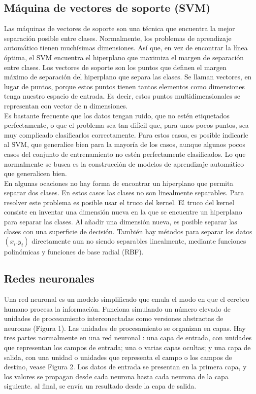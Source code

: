\documentclass[conference]{IEEEtran}
\begin{document}
\subsection{Máquina de vectores de soporte (SVM)}
Las máquinas de vectores de soporte son una técnica que encuentra la mejor separación posible entre clases. Normalmente, los problemas de aprendizaje automático tienen muchísimas dimensiones. Así que, en vez de encontrar la línea óptima, el SVM encuentra el hiperplano que maximiza el margen de separación entre clases. Los vectores de soporte son los puntos que definen el margen máximo de separación del hiperplano que separa las clases. Se llaman vectores, en lugar de puntos, porque estos puntos tienen tantos elementos como dimensiones tenga nuestro espacio de entrada. Es decir, estos puntos multidimensionales se representan con vector de n dimensiones.\\

Es bastante frecuente que los datos tengan ruido, que no estén etiquetados perfectamente, o que el problema sea tan difícil que, para unos pocos puntos, sea muy complicado clasificarlos correctamente. Para estos casos, es posible indicarle al SVM, que generalice bien para la mayoría de los casos, aunque algunos pocos casos del conjunto de entrenamiento no estén perfectamente clasificados. Lo que normalmente se busca es la construcción de modelos de aprendizaje automático que generalicen bien. \\

En algunas ocaciones no hay forma de encontrar un hiperplano que permita separar dos clases. En estos casos las clases no son linealmente separables. Para resolver este problema es posible usar el truco del kernel. El truco del kernel consiste en inventar una dimensión nueva en la que se encuentre un hiperplano para separar las clases. Al añadir una dimensión nueva, es posible separar las clases con una superficie de decisión. También hay métodos para separar los datos $(x_i. y_i)$ directamente aun no siendo separables linealmente, mediante funciones polinómicas y funciones de base radial (RBF).

\subsection{Redes neuronales}
Una red neuronal es un modelo simplificado que emula el modo en que el cerebro humano procesa la información. Funciona simulando un número elevado de unidades de procesamiento interconectadas como versiones abstractas de neuronas (Figura 1). Las unidades de procesamiento se organizan en capas. Hay tres partes normalmente en una red neuronal : una capa de entrada, con unidades que representan los campos de entrada; una o varias capas ocultas; y una capa de salida, con una unidad o unidades que representa el campo o los campos de destino, vease Figura 2. Los datos de entrada se presentan en la primera capa, y los valores se propagan desde cada neurona hasta cada neurona de la capa siguiente. al final, se envía un resultado desde la capa de salida.
\end{document}
